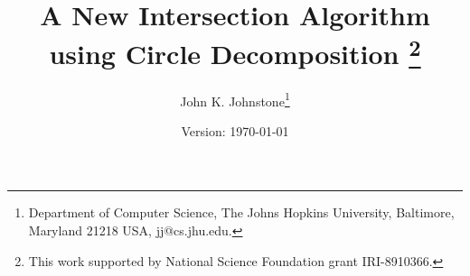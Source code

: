 \newtheorem{rmk}{Remark}[section]
\newtheorem{example}{Example}[section]
\newtheorem{conjecture}{Conjecture}[section]
\newtheorem{claim}{Claim}[section]
\newtheorem{notation}{Notation}[section]
\newtheorem{lemma}{Lemma}[section]
\newtheorem{theorem}{Theorem}[section]
\newtheorem{corollary}{Corollary}[section]
\newtheorem{defn2}{Definition}

\ifFull
\SingleSpace
\else
\DoubleSpace
\fi

\setlength{\oddsidemargin}{0pt}
\setlength{\evensidemargin}{0pt}
\setlength{\headsep}{0pt}
\setlength{\topmargin}{0pt}
\setlength{\textheight}{8.75in}
\setlength{\textwidth}{6.5in}



\setlength{\headsep}{.2in}
\setclock

	
\title{A New Intersection Algorithm using Circle Decomposition
	\thanks{This work supported by National Science Foundation grant
	IRI-8910366.}}
\author{John K. Johnstone\thanks{Department of Computer Science,
	The Johns Hopkins University,
	Baltimore, Maryland 21218 USA,
	jj@cs.jhu.edu.}}
\date{Version: \today \clock}




\maketitle


% 

